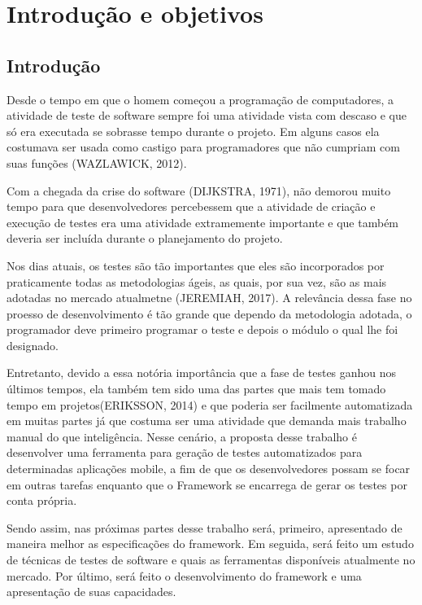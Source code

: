 \documentclass[
    12pt,       %
    openright,      %
    twoside,      %
    a4paper,      %
    english,      %
    french,       %
    spanish,      %
    brazil,       %
    ]{abntex2}
\begin{document}
  \chapter{Introdução e objetivos}
  \section{Introdução}
      Desde o tempo em que o homem começou a programação de computadores, a atividade
  de teste de software sempre foi uma atividade vista com descaso e que só era
  executada se sobrasse tempo durante o projeto. Em alguns casos ela costumava ser
  usada como castigo para programadores que não cumpriam com suas funções
  (WAZLAWICK, 2012).

  Com a chegada da crise do software (DIJKSTRA, 1971), não demorou muito tempo
  para que desenvolvedores percebessem que a atividade de criação e execução de
  testes era uma atividade extramemente importante e que também deveria ser
  incluída durante o planejamento do projeto.

  Nos dias atuais, os testes são tão importantes que eles são incorporados
  por praticamente todas as metodologias ágeis, as quais, por sua vez,
  são as mais adotadas no mercado atualmetne (JEREMIAH, 2017). A relevância dessa fase
  no proesso de desenvolvimento é tão grande que dependo da metodologia
  adotada, o programador deve primeiro programar o teste e depois o módulo
  o qual lhe foi designado.

  Entretanto, devido a essa notória importância que a fase de testes ganhou nos
  últimos tempos, ela também tem sido uma das partes que mais tem tomado tempo
  em projetos(ERIKSSON, 2014) e que poderia ser facilmente automatizada em muitas partes já que
  costuma ser uma atividade que demanda mais trabalho manual do que inteligência.
  Nesse cenário, a proposta desse trabalho é desenvolver uma ferramenta para
  geração de testes automatizados para determinadas aplicações mobile, a fim de
  que os desenvolvedores possam se focar em outras tarefas enquanto
  que o Framework se encarrega de gerar os testes por conta própria.

  Sendo assim, nas próximas partes desse trabalho será, primeiro, apresentado de maneira melhor
  as especificações do framework. Em seguida, será feito um estudo de técnicas de testes
  de software e quais as ferramentas disponíveis atualmente no mercado. Por último, será feito
  o desenvolvimento do framework e uma apresentação de suas capacidades.
\end{document}
